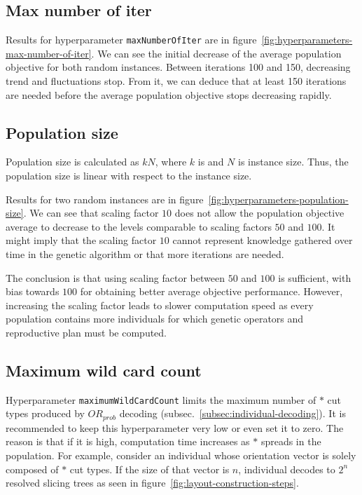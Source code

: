 \subsection{Max number of iter}\label{subsec:max-number-of-iter}
Results for hyperparameter \verb|maxNumberOfIter| are in figure~\ref{fig:hyperparameters-max-number-of-iter}.
We can see the initial decrease of the average population objective for both random instances.
Between iterations 100 and 150, decreasing trend and fluctuations stop.
From it, we can deduce that at least 150 iterations are needed before the average population objective
stops decreasing rapidly.

\subsection{Population size}\label{subsec:population-size}

Population size is calculated as $kN$, where $k$ is 
and $N$ is instance size.
Thus, the population size is linear with respect to the instance size.

Results for two random instances are in figure~\ref{fig:hyperparameters-population-size}.
We can see that scaling factor $10$ does not allow
the population objective average to decrease to the levels comparable to scaling factors $50$ and $100$.
It might imply that the scaling factor $10$ cannot represent knowledge gathered over time
in the genetic algorithm or that more iterations are needed.

The conclusion is that using scaling factor between $50$ and $100$ is sufficient, with bias towards $100$
for obtaining better average objective performance.
However, increasing the scaling factor leads to slower computation speed as every population contains
more individuals for which genetic operators and reproductive plan must be computed.

\subsection{Maximum wild card count}\label{subsec:maximum-wild-card-count}
Hyperparameter \verb|maximumWildCardCount| limits the maximum number of $*$ cut types produced by $OR_{prob}$ decoding (subsec.~\ref{subsec:individual-decoding}).
It is recommended to keep this hyperparameter very low or even set it to zero.
The reason is that if it is high, computation time increases as $*$ spreads in the population.
For example, consider an individual whose orientation vector is solely composed of $*$ cut types.
If the size of that vector is $n$, individual decodes to $2^n$ resolved slicing trees as seen in figure~\ref{fig:layout-construction-steps}.


